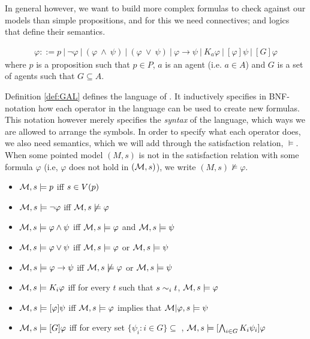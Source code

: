 In general however, we want to build more complex formulas to check against our models than simple propositions, and for this we need connectives; and logics that define their semantics.

\begin{definition} \hfill
	\label{def:GAL}
 	\begin{align*}
		\varphi ::= p \ | ~\neg\varphi ~|~ (\varphi~\wedge~\psi) ~|~ (\varphi~\vee~\psi) ~|~ \varphi 							
		\rightarrow \psi ~|~ K_a\varphi ~|~ [\varphi]\psi  ~|~ [G]\varphi
	\end{align*}
	where $p$ is a proposition such that $p \in P$, $a$ is an agent (i.e. $a \in A$) and $G$ is a set of agents such that $G \subseteq A$.
\end{definition}

Definition \ref{def:GAL} defines the language of . It inductively specifies in BNF-notation how each operator in the language can be used to create new formulas. This notation however merely specifies the \textit{syntax} of the language, which ways we are allowed to arrange the symbols. In order to specify what each operator does, we also need semantics, which we will add through the satisfaction relation, $\models$. When some pointed model $(M,s)$ is not in the satisfaction relation with some formula $\varphi$ (i.e, $\varphi$ does not hold in $(\mathcal{M},s)$), we write $(M,s)\not\models\varphi$.

\begin{definition} \hfill
	\label{def:GALsem}
	\begin{itemize}
		\item[] $\mathcal{M},s \models p $ iff $ s \in V(p)$
		\item[] $\mathcal{M},s \models \neg\varphi$ iff $ \mathcal{M},s \not\models \varphi$
		\item[] $\mathcal{M},s \models \varphi \wedge \psi $ iff $ \mathcal{M},s \models \varphi $ and $ \mathcal{M},s \models \psi$
		\item[] $\mathcal{M},s \models \varphi \vee \psi $ iff $ \mathcal{M},s \models \varphi $ or $ \mathcal{M},s \models \psi$
		\item[] $\mathcal{M},s \models \varphi \rightarrow \psi $ iff $ \mathcal{M},s \not\models \varphi $ or $ \mathcal{M},s \models \psi$
		\item[] $\mathcal{M},s \models K_i\varphi $ iff for every $t$ such that $s\sim_{i}t$, $\mathcal{M},s \models \varphi$
		\item[] $\mathcal{M},s \models [\varphi]\psi $ iff $ \mathcal{M},s \models \varphi $ implies that $ \mathcal{M}|\varphi,s \models \psi$
		\item[] $\mathcal{M},s \models [G]\varphi $ iff for every set $\{\psi_i: i \in G\} \subseteq $ , $ \mathcal{M},s \models [\bigwedge_{i\in G}K_i\psi_i]\varphi$ 
	\end{itemize}
\end{definition}

